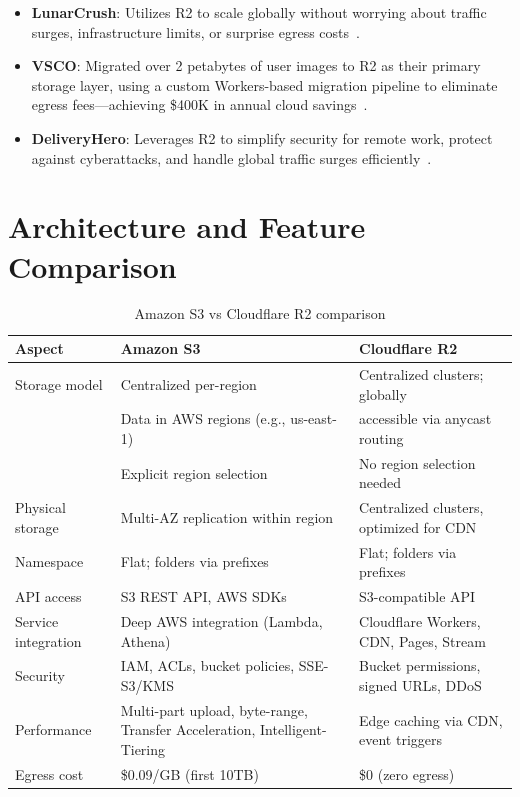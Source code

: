 \begin{itemize}
    \item \textbf{LunarCrush}: Utilizes R2 to scale globally without worrying about traffic surges, infrastructure limits, or surprise egress costs~\cite{cloudflare-lunarcrush}.

    \item \textbf{VSCO}: Migrated over 2 petabytes of user images to R2 as their primary storage layer, using a custom Workers-based migration pipeline to eliminate egress fees---achieving \$400K in annual cloud savings~\cite{cloudflare-vsco}.

    \item \textbf{DeliveryHero}: Leverages R2 to simplify security for remote work, protect against cyberattacks, and handle global traffic surges efficiently~\cite{cloudflare-deliveryhero}.
\end{itemize}

\section{Architecture and Feature Comparison}\label{sec:comparison}

\begin{table}[H]
\centering
\caption{Amazon S3 vs Cloudflare R2 comparison}
\label{tab:s3-r2}
\begin{tabular}{p{3.5cm}p{5.5cm}p{5.5cm}}
\hline
\textbf{Aspect}         & \textbf{Amazon S3}                      & \textbf{Cloudflare R2}                  \\
\hline
Storage model           & Centralized per-region                  & Centralized clusters; globally          \\
                        & Data in AWS regions (e.g., us-east-1)   & accessible via anycast routing          \\
                        & Explicit region selection               & No region selection needed              \\
\hline
Physical storage        & Multi-AZ replication within region      & Centralized clusters, optimized for CDN \\
\hline
Namespace               & Flat; folders via prefixes              & Flat; folders via prefixes              \\
\hline
API access              & S3 REST API, AWS SDKs                   & S3-compatible API                       \\
\hline
Service integration     & Deep AWS integration (Lambda, Athena)   & Cloudflare Workers, CDN, Pages, Stream  \\
\hline
Security                & IAM, ACLs, bucket policies, SSE-S3/KMS  & Bucket permissions, signed URLs, DDoS   \\
\hline
Performance             & Multi-part upload, byte-range, Transfer Acceleration, Intelligent-Tiering & Edge caching via CDN, event triggers   \\
\hline
Egress cost             & \$0.09/GB (first 10TB)                  & \$0 (zero egress)                       \\
\hline
\end{tabular}
\end{table}

